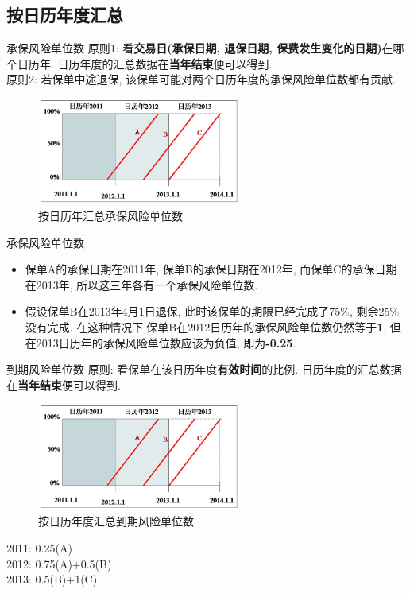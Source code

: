 \documentclass[professionalfont]{beamer}
\newcommand{\green}[1]{\textbf{#1}}
\begin{document}
\subsection{按日历年度汇总}
\begin{frame}{承保风险单位数}
	原则1: 看\green{交易日(承保日期, 退保日期, 保费发生变化的日期)}在哪个日历年. 日历年度的汇总数据在\green{当年结束}便可以得到.\\
	原则2: 若保单中途退保, 该保单可能对两个日历年度的承保风险单位数都有贡献.
	\begin{figure}
		\includegraphics[width=0.6\textwidth]{Plots/calendar_year.jpg}
		\caption{按日历年汇总承保风险单位数}
	\end{figure}
\end{frame}
\begin{frame}{承保风险单位数}
	\begin{itemize}
	\item 保单A的承保日期在2011年, 保单B的承保日期在2012年, 而保单C的承保日期在2013年, 所以这三年各有一个承保风险单位数.
	
	\item 假设保单B在2013年4月1日退保, 此时该保单的期限已经完成了75\%, 剩余25\%没有完成. 在这种情况下,保单B在2012日历年的承保风险单位数仍然等于\green{1}, 但在2013日历年的承保风险单位数应该为负值, 即为\green{-0.25}.
	\end{itemize}
\end{frame}
\begin{frame}{到期风险单位数}
	原则: 看保单在该日历年度\green{有效时间}的比例. 日历年度的汇总数据在\green{当年结束}便可以得到.
	\begin{figure}
		\includegraphics[width=0.6\textwidth]{Plots/calendar_year.jpg}
		\caption{按日历年度汇总到期风险单位数}
	\end{figure}
	2011: 0.25(A)\\
	2012: 0.75(A)+0.5(B)\\
	2013: 0.5(B)+1(C)
\end{frame}
\end{document}
